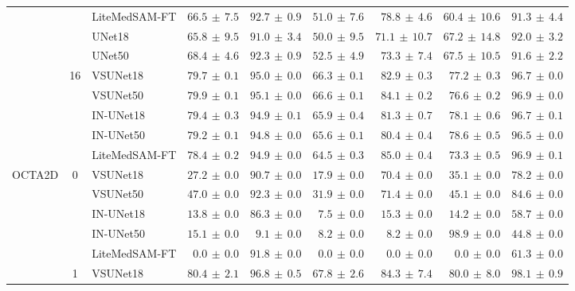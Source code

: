 \documentclass[twocolumn]{article}
\begin{document}
\begin{table}[t]
\begin{tabular}{l c l r r r r r r}
 &  & LiteMedSAM-FT & $66.5 \,\pm\, 7.5$ & $92.7 \,\pm\, 0.9$ & $51.0 \,\pm\, 7.6$ & $78.8 \,\pm\, 4.6$ & $60.4 \,\pm\, 10.6$ & $91.3 \,\pm\, 4.4$ \\
 &  & UNet18 & $65.8 \,\pm\, 9.5$ & $91.0 \,\pm\, 3.4$ & $50.0 \,\pm\, 9.5$ & $71.1 \,\pm\, 10.7$ & $67.2 \,\pm\, 14.8$ & $92.0 \,\pm\, 3.2$ \\
 &  & UNet50 & $68.4 \,\pm\, 4.6$ & $92.3 \,\pm\, 0.9$ & $52.5 \,\pm\, 4.9$ & $73.3 \,\pm\, 7.4$ & $67.5 \,\pm\, 10.5$ & $91.6 \,\pm\, 2.2$ \\
\cline{2-9}
 & \multirow{5}{*}{16} & VSUNet18 & $79.7 \,\pm\, 0.1$ & $95.0 \,\pm\, 0.0$ & $66.3 \,\pm\, 0.1$ & $82.9 \,\pm\, 0.3$ & $77.2 \,\pm\, 0.3$ & $96.7 \,\pm\, 0.0$ \\
 &  & VSUNet50 & $\mathbf{79.9} \,\pm\, 0.1$ & $95.1 \,\pm\, 0.0$ & $66.6 \,\pm\, 0.1$ & $84.1 \,\pm\, 0.2$ & $76.6 \,\pm\, 0.2$ & $96.9 \,\pm\, 0.0$ \\
 &  & IN-UNet18 & $79.4 \,\pm\, 0.3$ & $94.9 \,\pm\, 0.1$ & $65.9 \,\pm\, 0.4$ & $81.3 \,\pm\, 0.7$ & $78.1 \,\pm\, 0.6$ & $96.7 \,\pm\, 0.1$ \\
 &  & IN-UNet50 & $79.2 \,\pm\, 0.1$ & $94.8 \,\pm\, 0.0$ & $65.6 \,\pm\, 0.1$ & $80.4 \,\pm\, 0.4$ & $78.6 \,\pm\, 0.5$ & $96.5 \,\pm\, 0.0$ \\
 &  & LiteMedSAM-FT & $78.4 \,\pm\, 0.2$ & $94.9 \,\pm\, 0.0$ & $64.5 \,\pm\, 0.3$ & $85.0 \,\pm\, 0.4$ & $73.3 \,\pm\, 0.5$ & $96.9 \,\pm\, 0.1$ \\
\hline
\multirow{19}{*}{OCTA2D} & \multirow{5}{*}{0} & VSUNet18 & $27.2 \,\pm\, 0.0$ & $90.7 \,\pm\, 0.0$ & $17.9 \,\pm\, 0.0$ & $70.4 \,\pm\, 0.0$ & $35.1 \,\pm\, 0.0$ & $78.2 \,\pm\, 0.0$ \\
 &  & VSUNet50 & $\mathbf{47.0} \,\pm\, 0.0$ & $92.3 \,\pm\, 0.0$ & $31.9 \,\pm\, 0.0$ & $71.4 \,\pm\, 0.0$ & $45.1 \,\pm\, 0.0$ & $84.6 \,\pm\, 0.0$ \\
 &  & IN-UNet18 & $13.8 \,\pm\, 0.0$ & $86.3 \,\pm\, 0.0$ & $7.5 \,\pm\, 0.0$ & $15.3 \,\pm\, 0.0$ & $14.2 \,\pm\, 0.0$ & $58.7 \,\pm\, 0.0$ \\
 &  & IN-UNet50 & $15.1 \,\pm\, 0.0$ & $9.1 \,\pm\, 0.0$ & $8.2 \,\pm\, 0.0$ & $8.2 \,\pm\, 0.0$ & $98.9 \,\pm\, 0.0$ & $44.8 \,\pm\, 0.0$ \\
 &  & LiteMedSAM-FT & $0.0 \,\pm\, 0.0$ & $91.8 \,\pm\, 0.0$ & $0.0 \,\pm\, 0.0$ & $0.0 \,\pm\, 0.0$ & $0.0 \,\pm\, 0.0$ & $61.3 \,\pm\, 0.0$ \\
\cline{2-9}
 & \multirow{7}{*}{1} & VSUNet18 & $80.4 \,\pm\, 2.1$ & $96.8 \,\pm\, 0.5$ & $67.8 \,\pm\, 2.6$ & $84.3 \,\pm\, 7.4$ & $80.0 \,\pm\, 8.0$ & $98.1 \,\pm\, 0.9$ \\

\end{tabular}
\end{table}
\end{document}
